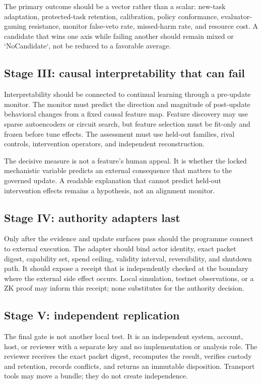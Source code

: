 \documentclass[11pt,twoside]{article}
\begin{document}
  The primary outcome should be a vector rather than a scalar: new-task adaptation, protected-task retention, calibration, policy conformance, evaluator-gaming resistance, monitor false-veto rate, missed-harm rate, and resource cost. A candidate that wins one axis while failing another should remain mixed or `NoCandidate`, not be reduced to a favorable average.

\subsection{Stage III: causal interpretability that can fail}

  Interpretability should be connected to continual learning through a pre-update monitor. The monitor must predict the direction and magnitude of post-update behavioral changes from a fixed causal feature map. Feature discovery may use sparse autoencoders or circuit search, but feature selection must be fit-only and frozen before tune effects. The assessment must use held-out families, rival controls, intervention operators, and independent reconstruction.

  \enlargethispage{2\baselineskip}
  The decisive measure is not a feature's human appeal. It is whether the locked mechanistic variable predicts an external consequence that matters to the governed update. A readable explanation that cannot predict held-out intervention effects remains a hypothesis, not an alignment monitor.

\subsection{Stage IV: authority adapters last}

  Only after the evidence and update surfaces pass should the programme connect to external execution. The adapter should bind actor identity, exact packet digest, capability set, spend ceiling, validity interval, reversibility, and shutdown path. It should expose a receipt that is independently checked at the boundary where the external side effect occurs. Local simulation, testnet observations, or a ZK proof may inform this receipt; none substitutes for the authority decision.

\subsection{Stage V: independent replication}

  The final gate is not another local test. It is an independent system, account, host, or reviewer with a separate key and no implementation or analysis role. The reviewer receives the exact packet digest, recomputes the result, verifies custody and retention, records conflicts, and returns an immutable disposition. Transport tools may move a bundle; they do not create independence.
\end{document}
